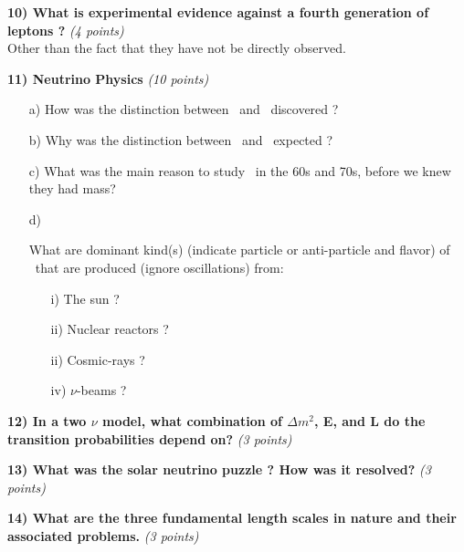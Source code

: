 {\textbf{10) What is experimental evidence against a fourth generation of leptons ? } \hfill \textit{(4 points)}\\
Other than the fact that they have not be directly observed.
\vspace{0.5in}

\textbf{11) Neutrino Physics } \hfill \textit{(10 points)}\\
\begin{itemize}
\item[a)]{How was the distinction between \numu\ and \nue\ discovered ?
\vspace*{0.5in}
}

\item[b)]{Why was the distinction between \numu\ and \nue\  expected ?
\vspace*{0.5in}
}
\item[c)]{What was the main reason to study \nus\ in the 60s and 70s, before we knew they had mass?
\vspace*{0.5in}
}
\item[d)]{What are dominant kind(s) (indicate particle or anti-particle and flavor) of \nus\ that are produced (ignore oscillations) from:
\begin{itemize}
\item[i)]{ The sun ? 
\vspace*{0.25in}
} 
\item[ii)]{Nuclear reactors ? 
\vspace*{0.25in}
}
\item[ii)]{Cosmic-rays ? 
\vspace*{0.25in}
}
\item[iv)]{$\nu$-beams ?
\vspace*{0.25in}
}
\end{itemize}
}
\end{itemize}


\textbf{12) In a two $\nu$ model, what combination of $\Delta m^2$, E, and L do the transition probabilities depend on?  } \hfill \textit{(3 points)}\\
\vspace*{0.5in}

\textbf{13) What was the solar neutrino puzzle ? How was it resolved?  } \hfill \textit{(3 points)}\\
\vspace{0.5in}


\textbf{14) What are the three fundamental length scales in nature and their associated problems.  } \hfill \textit{(3 points)}\\
\vspace{0.5in}


} %

